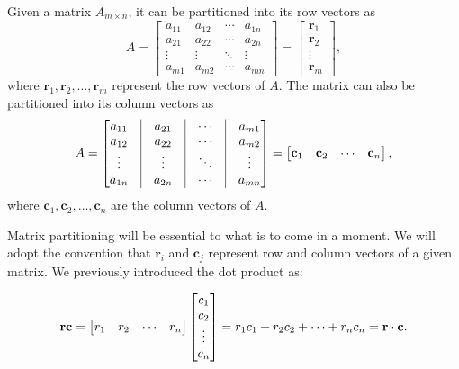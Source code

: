 \documentclass[12pt]{article}
\begin{document}
\begin{definition}
    Given a matrix $A_{m \times n}$, it can be partitioned into its row vectors as
    \[
    A =
    \begin{bmatrix}
    a_{11} & a_{12} & \cdots & a_{1n} \\
    \hline
    a_{21} & a_{22} & \cdots & a_{2n} \\
    \hline
    \vdots & \vdots & \ddots & \vdots \\
    \hline
    a_{m1} & a_{m2} & \cdots & a_{mn}
    \end{bmatrix}
    =
    \begin{bmatrix}
    \mathbf{r}_{1} \\
    \mathbf{r}_{2} \\
    \vdots \\
    \mathbf{r}_{m}
    \end{bmatrix},
    \]
    where $\mathbf{r}_{1}, \mathbf{r}_{2}, \ldots, \mathbf{r}_{m}$ represent the row vectors of $A$. The matrix can also be partitioned into its column vectors as
    \[
    A =
    \begin{bmatrix}
    a_{11} & \vline & a_{21} & \vline & \cdots & \vline & a_{m1} \\
    a_{12} & \vline & a_{22} & \vline & \cdots & \vline & a_{m2} \\
    \vdots & \vline & \vdots & \vline & \ddots & \vline & \vdots \\
    a_{1n} & \vline & a_{2n} & \vline & \cdots & \vline & a_{mn}
    \end{bmatrix}
    =
    \begin{bmatrix}
    \mathbf{c}_{1} & \mathbf{c}_{2} & \cdots & \mathbf{c}_{n}
    \end{bmatrix},
    \]
    where $\mathbf{c}_{1}, \mathbf{c}_{2}, \ldots, \mathbf{c}_{n}$ are the column vectors of $A$.
\end{definition}

Matrix partitioning will be essential to what is to come in a moment. We will adopt the convention that $\mathbf{r}_i$ and $\mathbf{c}_j$ represent row and column vectors of a given matrix. We previously introduced the dot product as:

\[
\mathbf{r} \mathbf{c}
= \begin{bmatrix} r_{1} & r_{2} & \cdots & r_{n} \end{bmatrix}
  \begin{bmatrix}
  c_{1} \\
  c_{2} \\
  \vdots \\
  c_{n}
  \end{bmatrix}
= r_{1} c_{1} + r_{2} c_{2} + \cdots + r_{n} c_{n}
= \mathbf{r} \cdot \mathbf{c}.
\]
\end{document}
